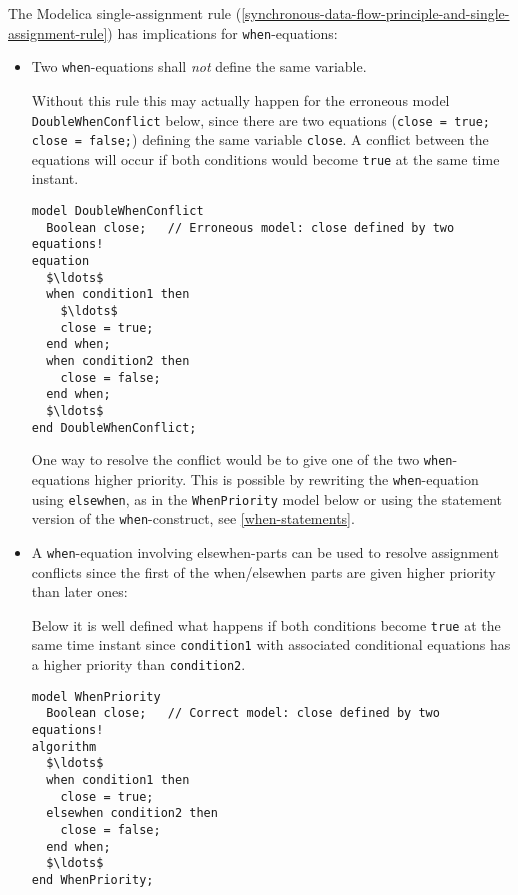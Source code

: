 The Modelica single-assignment rule (\cref{synchronous-data-flow-principle-and-single-assignment-rule}) has implications for \lstinline!when!-equations:
\begin{itemize}
\item
  Two \lstinline!when!-equations shall \emph{not} define the same variable.

\begin{nonnormative}
Without this rule this may actually happen for the erroneous
model \lstinline!DoubleWhenConflict! below, since there are two equations
(\lstinline!close = true; close = false;!) defining the same variable
\lstinline!close!. A conflict between the equations will occur if both
conditions would become \lstinline!true! at the same time instant.
\begin{lstlisting}[language=modelica]
model DoubleWhenConflict
  Boolean close;   // Erroneous model: close defined by two equations!
equation
  $\ldots$
  when condition1 then
    $\ldots$
    close = true;
  end when;
  when condition2 then
    close = false;
  end when;
  $\ldots$
end DoubleWhenConflict;
\end{lstlisting}

One way to resolve the conflict would be to give one of the two \lstinline!when!-equations higher priority.
This is possible by rewriting the \lstinline!when!-equation using \lstinline!elsewhen!, as in the \lstinline!WhenPriority! model below or using the statement version of the \lstinline!when!-construct, see \cref{when-statements}.
\end{nonnormative}

\item
  A \lstinline!when!-equation involving elsewhen-parts can be used to resolve assignment conflicts since the first of the when/elsewhen parts are given higher priority than later ones:
\begin{nonnormative}
Below it is well defined what happens if both conditions
become \lstinline!true! at the same time instant since \lstinline!condition1! with
associated conditional equations has a higher priority than \lstinline!condition2!.
\begin{lstlisting}[language=modelica]
model WhenPriority
  Boolean close;   // Correct model: close defined by two equations!
algorithm
  $\ldots$
  when condition1 then
    close = true;
  elsewhen condition2 then
    close = false;
  end when;
  $\ldots$
end WhenPriority;
\end{lstlisting}
\end{nonnormative}
\end{itemize}

